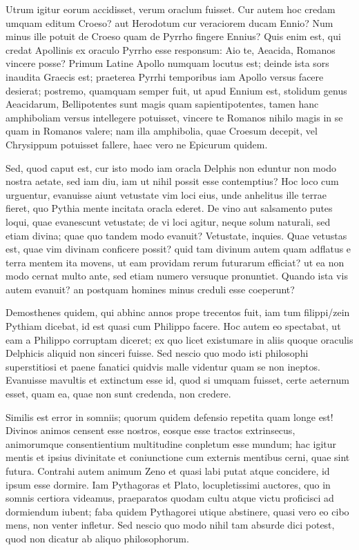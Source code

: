  Utrum igitur eorum accidisset, verum oraclum fuisset. Cur autem hoc credam umquam editum Croeso? aut Herodotum cur veraciorem ducam Ennio? Num minus ille potuit de Croeso quam de Pyrrho fingere Ennius? Quis enim est, qui credat Apollinis ex oraculo Pyrrho esse responsum: Aio te, Aeacida, Romanos vincere posse? Primum Latine Apollo numquam locutus est; deinde ista sors inaudita Graecis est; praeterea Pyrrhi temporibus iam Apollo versus facere desierat; postremo, quamquam semper fuit, ut apud Ennium est, stolidum genus Aeacidarum, Bellipotentes sunt magis quam sapientipotentes, tamen hanc amphiboliam versus intellegere potuisset, vincere te Romanos nihilo magis in se quam in Romanos valere; nam illa amphibolia, quae Croesum decepit, vel Chrysippum potuisset fallere, haec vero ne Epicurum quidem.

 Sed, quod caput est, cur isto modo iam oracla Delphis non eduntur non modo nostra aetate, sed iam diu, iam ut nihil possit esse contemptius? Hoc loco cum urguentur, evanuisse aiunt vetustate vim loci eius, unde anhelitus ille terrae fieret, quo Pythia mente incitata oracla ederet. De vino aut salsamento putes loqui, quae evanescunt vetustate; de vi loci agitur, neque solum naturali, sed etiam divina; quae quo tandem modo evanuit? Vetustate, inquies. Quae vetustas est, quae vim divinam conficere possit? quid tam divinum autem quam adflatus e terra mentem ita movens, ut eam providam rerum futurarum efficiat? ut ea non modo cernat multo ante, sed etiam numero versuque pronuntiet. Quando ista vis autem evanuit? an postquam homines minus creduli esse coeperunt?

 Demosthenes quidem, qui abhinc annos prope trecentos fuit, iam tum filippi/zein Pythiam dicebat, id est quasi cum Philippo facere. Hoc autem eo spectabat, ut eam a Philippo corruptam diceret; ex quo licet existumare in aliis quoque oraculis Delphicis aliquid non sinceri fuisse. Sed nescio quo modo isti philosophi superstitiosi et paene fanatici quidvis malle videntur quam se non ineptos. Evanuisse mavultis et extinctum esse id, quod si umquam fuisset, certe aeternum esset, quam ea, quae non sunt credenda, non credere.

 Similis est error in somniis; quorum quidem defensio repetita quam longe est! Divinos animos censent esse nostros, eosque esse tractos extrinsecus, animorumque consentientium multitudine conpletum esse mundum; hac igitur mentis et ipsius divinitate et coniunctione cum externis mentibus cerni, quae sint futura. Contrahi autem animum Zeno et quasi labi putat atque concidere, id ipsum esse dormire. Iam Pythagoras et Plato, locupletissimi auctores, quo in somnis certiora videamus, praeparatos quodam cultu atque victu proficisci ad dormiendum iubent; faba quidem Pythagorei utique abstinere, quasi vero eo cibo mens, non venter infletur. Sed nescio quo modo nihil tam absurde dici potest, quod non dicatur ab aliquo philosophorum.

